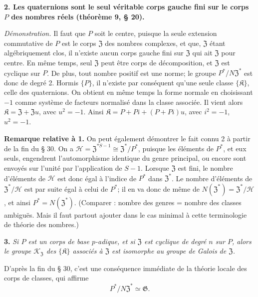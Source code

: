 \noindent\textbf{2. Les quaternions sont le seul véritable corps gauche fini sur le corps \(P\) des nombres réels (théorème 9, \S{} 20).}

\noindent\emph{Démonstration.} Il faut que \(P\) soit le centre, puisque la seule extension commutative de \(P\) est le corps \(\mathfrak Z\) des nombres complexes, et que, \(\mathfrak Z\) étant algébriquement clos, il n'existe aucun corps gauche fini sur \(\mathfrak Z\) qui ait \(\mathfrak Z\) pour centre. En même temps, seul \(\mathfrak Z\) peut être corps de décomposition, et \(\mathfrak Z\) est cyclique sur \(P\). De plus, tout nombre positif est une norme; le groupe \(P^*/N\mathfrak Z^*\) est donc de degré 2. Hormis \(\{P\}\), il n'existe par conséquent qu'une seule classe \(\{\mathfrak K\}\), celle des quaternions. On obtient en même temps la forme normale en choisissant \(-1\) comme système de facteurs normalisé dans la classe associée. Il vient alors \(\mathfrak K=\mathfrak Z+\mathfrak Zu\), avec \(u^2=-1\). Ainsi \(\mathfrak K=P+Pi+(P+Pi)u\), avec \(i^2=-1\), \(u^2=-1\).

\noindent\textbf{Remarque relative à 1.} On peut également démontrer le fait connu 2 à partir de la fin du \S{} 30. On a \(\mathscr H=\mathfrak Z^{*S-1}\cong\mathfrak Z^*/P^*\), puisque les éléments de \(P^*\), et eux seuls, engendrent l'automorphisme identique du genre principal, ou encore sont envoyés sur l'unité par l'application de \(S-1\). Lorsque \(\mathfrak Z\) est fini, le nombre d'éléments de \(\mathscr H\) est donc égal à l'indice de \(P^*\) dans \(\mathfrak Z^*\). Le nombre d'éléments de \(\mathfrak Z^*/\mathscr H\) est par suite égal à celui de \(P^*\); il en va donc de même de \(N(\mathfrak Z^*)=\mathfrak Z^*/\mathscr H\), et ainsi \(P^*=N(\mathfrak Z^*)\). (Comparer : nombre des genres = nombre des classes ambiguës. Mais il faut partout ajouter \og dans le cas minimal\fg{} à cette terminologie de théorie des nombres.)

\noindent\textbf{3.} \emph{Si \(P\) est un corps de base \(p\)-adique, et si \(\mathfrak Z\) est cyclique de degré \(n\) sur \(P\), alors le groupe \(\mathscr K_{\mathfrak Z}\) des \(\{\mathfrak K\}\) associés à \(\mathfrak Z\) est isomorphe au groupe de Galois de \(\mathfrak Z\).}

D'après la fin du \S{} 30, c'est une conséquence immédiate de la \og théorie locale des corps de classes\fg{}, qui affirme
\[
P^*/N\mathfrak Z^*\simeq\mathfrak G.
\]

